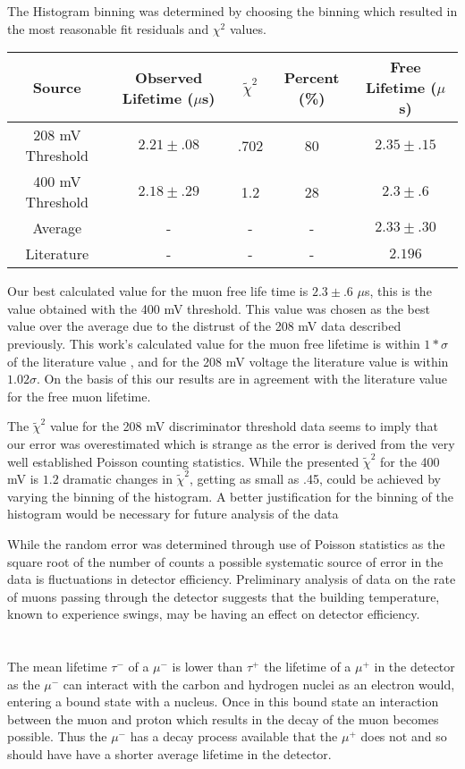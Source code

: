 \documentclass[11pt,letterpaper]{article}
\begin{document}
The Histogram binning was determined by choosing the binning which resulted in the most reasonable fit residuals and $\chi^2$ values.
\begin{center}
	\begin{tabular}{|c|c|c|c|c|}\hline
		Source & Observed Lifetime ($\mu$s)& $\tilde{\chi}^2$&Percent (\%)&Free Lifetime ($\mu$s)\\ \hline\hline
		208 mV Threshold &$2.21\pm .08$ & .702 & 80 &$2.35 \pm .15$  \\ \hline
		400 mV Threshold & $2.18\pm .29$& 1.2  & 28 &$2.3 \pm .6$ \\ \hline
		Average          & -            &-     &-&$2.33 \pm .30$\\ \hline
        Literature       & -            &-     &-&$2.196$  \\ \hline
	\end{tabular}
\end{center}
Our best calculated value for the muon free life time is $2.3 \pm .6$ $\mu$s, this is the value obtained with the 400 mV threshold. This value was chosen as the best value over the average due to the distrust of the 208 mV data described previously. This work's calculated value for the muon free lifetime is within $1*\sigma$ of the literature value , and for the 208 mV voltage the literature value is within $1.02\sigma$. On the basis of this our results are in agreement with the literature value for the free muon lifetime.

The $\tilde{\chi}^2$ value for the 208 mV discriminator threshold data seems to imply that our error was overestimated which is strange as the error is derived from the very well established Poisson counting statistics. While the presented $\tilde{\chi}^2$ for the 400 mV is $1.2$ dramatic changes in $\tilde{\chi}^2$, getting as small as .45, could be achieved by varying the binning of the histogram. A better justification for the binning of the histogram would be necessary for future analysis of the data

While the random error was determined through use of Poisson statistics as the square root of the number of counts a possible systematic source of error in the data is fluctuations in detector efficiency. Preliminary analysis of data on the rate of muons passing through the detector suggests that the building temperature, known to experience swings, may be having an effect on detector efficiency.
\section{} %
The mean lifetime $\tau^-$ of a $\mu^-$ is lower than $\tau^+$ the lifetime of a $\mu^+$ in the detector as the $\mu^-$ can interact with the carbon and hydrogen nuclei as an electron would, entering a bound state with a nucleus. Once in this bound state an interaction between the muon and proton which results in the decay of the muon becomes possible. Thus the $\mu^-$ has a decay process available that the $\mu^+$ does not and so should have have a shorter average lifetime in the detector. 
\end{document}

